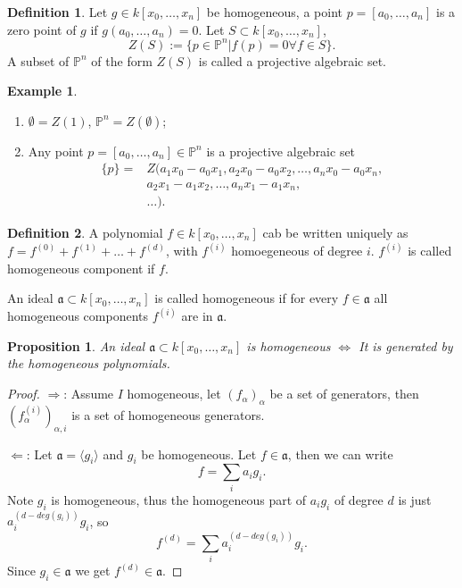 \documentclass{amsart}
\theoremstyle{plain}
\newtheorem{proposition}{Proposition}
\theoremstyle{definition}
\newtheorem{definition}{Definition}
\newtheorem{example}{Example}
\theoremstyle{remark}
\numberwithin{equation}{section}
\begin{document}
  \begin{definition}
  	Let $ g\in k[x_0,\dots,x_n] $ be homogeneous, a point $ p=[a_0,\dots,a_n] $ is a zero point of $ g $ if $ g(a_0,\dots,a_n)=0 $. Let $ S\subset k[x_0,\dots,x_n] $,
  	\begin{equation}
  	Z(S):=\{ p\in\mathbb{P}^n|f(p)=0 \forall f\in S \}.
  	\end{equation}
  	A subset of $ \mathbb{P}^n $ of the form $ Z(S) $ is called a projective algebraic set.
  \end{definition}
  \begin{example}
  	\begin{enumerate}
  		\item $ \emptyset=Z(1) $, $ \mathbb{P}^n=Z(\emptyset) $;
  		\item Any point $ p=[a_0,\dots,a_n]\in\mathbb{P}^n $ is a projective algebraic set
  		$$\begin{array}{cc}
  		\{ p \}= & Z(a_1x_0-a_0x_1,a_2x_0-a_0x_2,\dots,a_nx_0-a_0x_n,\\
  		{} & a_2x_1-a_1x_2,\dots,a_nx_1-a_1x_n,\\
  		{} & \dots).
  		\end{array}$$
  	\end{enumerate}
  \end{example}
  \begin{definition}
  	A polynomial $ f\in k[x_0,\dots,x_n] $ cab be written uniquely as $ f=f^{(0)}+f^{(1)}+\dots+ f^{(d)} $, with $ f^{(i)} $ homoegeneous of degree $ i $. $ f^{(i)} $ is called homogeneous component if $ f $.
  	
  	An ideal $ \mathfrak{a}\subset k[x_0,\dots,x_n] $ is called homogeneous if for every $ f\in \mathfrak{a} $ all homogeneous components $ f^{(i)} $ are in $ \mathfrak{a} $.
  \end{definition}
  \begin{proposition}
  	An ideal $ \mathfrak{a}\subset k[x_0,\dots,x_n] $ is homogeneous $ \Leftrightarrow $ It is generated by the homogeneous polynomials.
  \end{proposition}
  \begin{proof}
  	$ \Rightarrow $: Assume $ I $ homogeneous, let $ (f_\alpha)_\alpha $ be a set of generators, then $ (f^{(i)}_\alpha)_{\alpha,i} $ is a set of homogeneous generators.
  	
  	$ \Leftarrow $: Let $ \mathfrak{a} =\langle g_i\rangle $ and $ g_i $ be homogeneous. Let $ f\in \mathfrak{a}$, then we can write
  	\begin{equation}
  	f=\sum\limits_{i}a_ig_i.
  	\end{equation}
  	Note $ g_i $ is homogeneous, thus the homogeneous part of $ a_ig_i $ of degree $ d $ is just $ a_i^{(d-deg(g_i))}g_i $, so
  	\begin{equation}
  	f^{(d)}=\sum\limits_{i} a_i^{(d-deg(g_i))}g_i.
  	\end{equation}
  	Since $ g_i\in \mathfrak{a} $ we get $ f^{(d)}\in \mathfrak{a} $.
  \end{proof}
\end{document}
